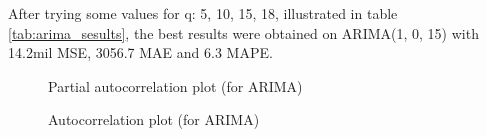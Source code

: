 \documentclass[12pt]{article}
\begin{document}
After trying some values for q: 5, 10, 15, 18, illustrated in table \ref{tab:arima_sesults}, the best results were obtained on ARIMA(1, 0, 15) with 14.2mil MSE, 3056.7 MAE and 6.3 MAPE.

\begin{figure}
    \caption{Partial autocorrelation plot (for ARIMA)}
    \label{fig:pacfplot}
\end{figure}

\begin{figure}
    \caption{Autocorrelation plot (for ARIMA)}
    \label{fig:acfplot}
\end{figure}
\end{document}
